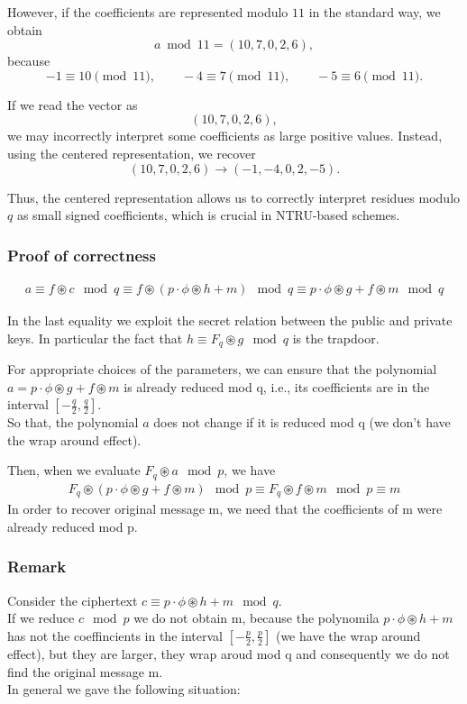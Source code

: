\noindent
However, if the coefficients are represented modulo \(11\) in the standard way, we obtain
\[
a \bmod 11 = (10,7,0,2,6),
\]
because
\[
-1 \equiv 10 \pmod{11}, \qquad
-4 \equiv 7 \pmod{11}, \qquad
-5 \equiv 6 \pmod{11}.
\]

\noindent
If we read the vector as
\[
(10,7,0,2,6),
\]
we may incorrectly interpret some coefficients as large positive values.  
Instead, using the centered representation, we recover
\[
(10,7,0,2,6)
\longrightarrow
(-1,-4,0,2,-5).
\]

\noindent
Thus, the centered representation allows us to correctly interpret residues modulo \(q\) as small signed coefficients, which is crucial in NTRU-based schemes.

\subsubsection*{Proof of correctness}
\begin{align*}
a \equiv f \circledast c \mod q \equiv f \circledast (p \cdot \phi \circledast h + m) \mod q \equiv p \cdot \phi \circledast g + f \circledast m \mod q
\end{align*}

\noindent
In the last equality we exploit the secret relation between the public and private keys. In particular the fact that $h \equiv F_q \circledast g \mod q$ is the trapdoor.
\medskip

\noindent
For appropriate choices of the parameters, we can ensure that the polynomial $a = p \cdot \phi \circledast g + f \circledast m$ is already reduced mod q, i.e., its coefficients are in the interval $[-\frac{q}{2}, \frac{q}{2}]$.\\
So that, the polynomial $a$ does not change if it is reduced mod q (we don't have the wrap around effect).
\medskip

\noindent
Then, when we evaluate $F_q \circledast a \mod p$, we have 
\begin{align*}
    F_q \circledast (p \cdot \phi \circledast g + f \circledast m) \mod p \equiv F_q \circledast f \circledast m \mod p \equiv m
\end{align*}
\noindent
In order to recover original message m, we need that the coefficients of m were already reduced mod p.

\subsubsection*{Remark}
Consider the ciphertext $c \equiv p \cdot \phi \circledast h + m \mod q$.\\
If we reduce $c \mod p$ we do not obtain m, because the polynomila $p \cdot \phi \circledast h + m$ has not the coeffincients  in the interval $[-\frac{p}{2}, \frac{p}{2}]$ (we have the wrap around effect), but they are larger, they wrap aroud mod q and consequently we do not find the original message m.\\
In general we gave the following situation:

